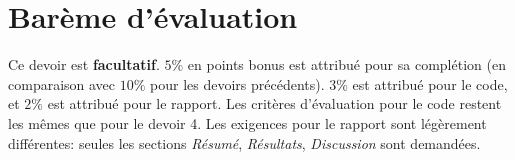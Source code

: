 \documentclass[12pt, letterpaper]{article}
\begin{document}
\section{Barème d’évaluation}\label{sec:criteres}

\noindent Ce devoir est \textbf{facultatif}.
$5\%$ en points bonus est attribué pour sa complétion (en comparaison avec $10\%$ pour les devoirs précédents).
$3\%$ est attribué pour le code, et $2\%$ est attribué pour le rapport.
Les critères d'évaluation pour le code restent les mêmes que pour le devoir 4.
Les exigences pour le rapport sont légèrement différentes: seules les sections \textit{Résumé}, \textit{Résultats}, \textit{Discussion} sont demandées.

\printbibliography
\end{document}
